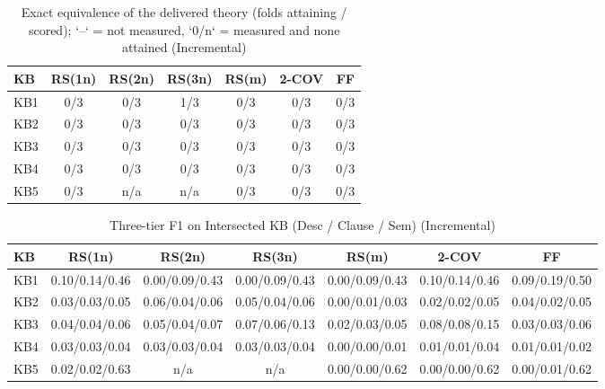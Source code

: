 \begin{table}[htbp]
\centering
\caption{Exact equivalence of the delivered theory (folds attaining / scored); `--` = not measured, `0/n` = measured and none attained (Incremental)}
\label{tab:exact_equiv_incremental}
\begin{tabular}{lcccccc}
\toprule
KB & RS(1n) & RS(2n) & RS(3n) & RS(m) & 2-COV & FF \\
\midrule
KB1 & 0/3 & 0/3 & 1/3 & 0/3 & 0/3 & 0/3 \\
KB2 & 0/3 & 0/3 & 0/3 & 0/3 & 0/3 & 0/3 \\
KB3 & 0/3 & 0/3 & 0/3 & 0/3 & 0/3 & 0/3 \\
KB4 & 0/3 & 0/3 & 0/3 & 0/3 & 0/3 & 0/3 \\
KB5 & 0/3 & n/a & n/a & 0/3 & 0/3 & 0/3 \\
\bottomrule
\end{tabular}
\end{table}

\begin{table}[htbp]
\centering
\caption{Three-tier F1 on Intersected KB (Desc / Clause / Sem) (Incremental)}
\label{tab:three_tier_f1_incremental}
\begin{tabular}{lcccccc}
\toprule
KB & RS(1n) & RS(2n) & RS(3n) & RS(m) & 2-COV & FF \\
\midrule
KB1 & 0.10/0.14/0.46 & 0.00/0.09/0.43 & 0.00/0.09/0.43 & 0.00/0.09/0.43 & 0.10/0.14/0.46 & 0.09/0.19/0.50 \\
KB2 & 0.03/0.03/0.05 & 0.06/0.04/0.06 & 0.05/0.04/0.06 & 0.00/0.01/0.03 & 0.02/0.02/0.05 & 0.04/0.02/0.05 \\
KB3 & 0.04/0.04/0.06 & 0.05/0.04/0.07 & 0.07/0.06/0.13 & 0.02/0.03/0.05 & 0.08/0.08/0.15 & 0.03/0.03/0.06 \\
KB4 & 0.03/0.03/0.04 & 0.03/0.03/0.04 & 0.03/0.03/0.04 & 0.00/0.00/0.01 & 0.01/0.01/0.04 & 0.01/0.01/0.02 \\
KB5 & 0.02/0.02/0.63 & n/a & n/a & 0.00/0.00/0.62 & 0.00/0.00/0.62 & 0.00/0.01/0.62 \\
\bottomrule
\end{tabular}
\end{table}

